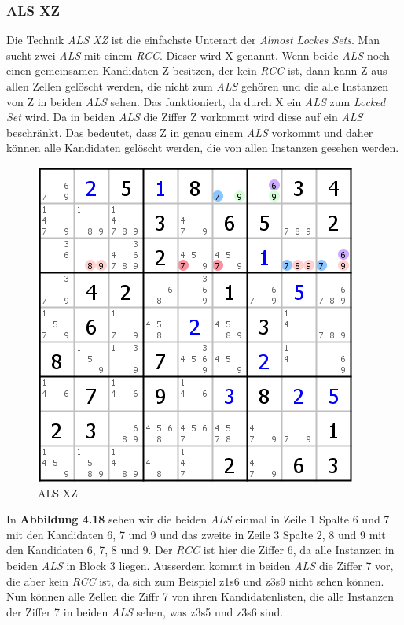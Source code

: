 \newpage
\subsubsection{ALS XZ}
Die Technik \textit{ALS XZ} ist die einfachste Unterart der \textit{Almost Lockes Sets}. Man sucht zwei \textit{ALS} mit einem \textit{RCC}. Dieser wird X genannt. Wenn beide \textit{ALS} noch einen gemeinsamen Kandidaten Z besitzen, der kein \textit{RCC} ist, dann kann Z aus allen Zellen gelöscht werden, die nicht zum \textit{ALS} gehören und die alle Instanzen von Z in beiden \textit{ALS} sehen. Das funktioniert, da durch X ein \textit{ALS} zum \textit{Locked Set} wird. Da in beiden \textit{ALS} die Ziffer Z vorkommt wird diese auf ein \textit{ALS} beschränkt. Das bedeutet, dass Z in genau einem \textit{ALS} vorkommt und daher können alle Kandidaten gelöscht werden, die von allen Instanzen gesehen werden.

\begin{figure}[h]
\begin{center}
\includegraphics{./img/ALS_XZ.png}
\caption{ALS XZ}
\end{center}
\end{figure}

In \textbf{Abbildung 4.18} sehen wir die beiden \textit{ALS} einmal in Zeile 1 Spalte 6 und 7 mit den Kandidaten 6, 7 und 9 und das zweite in Zeile 3 Spalte 2, 8 und 9 mit den Kandidaten 6, 7, 8 und 9. Der \textit{RCC} ist hier die Ziffer 6, da alle Instanzen in beiden \textit{ALS} in Block 3 liegen. Ausserdem kommt in beiden \textit{ALS} die Ziffer 7 vor, die aber kein \textit{RCC} ist, da sich zum Beispiel z1s6 und z3s9 nicht sehen können. Nun können alle Zellen die Ziffr 7 von ihren Kandidatenlisten, die alle Instanzen der Ziffer 7 in beiden \textit{ALS} sehen, was z3s5 und z3s6 sind.